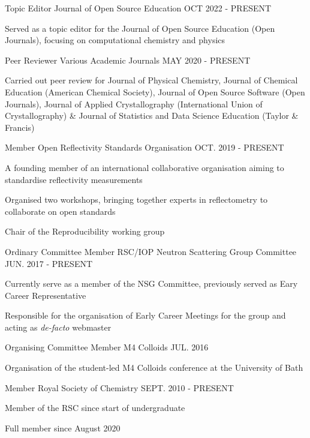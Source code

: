 \begin{cventries}
  \cventry
    {Topic Editor}
    {Journal of Open Source Education}
    {}
    {OCT 2022 - PRESENT}
    {
    	\begin{cvitems}
	    \item{Served as a topic editor for the Journal of Open Source Education (Open Journals), focusing on computational chemistry and physics}
	\end{cvitems}
    }
  \cventry
    {Peer Reviewer}
    {Various Academic Journals}
    {}
    {MAY 2020 - PRESENT}
    {
        \begin{cvitems}
            \item{Carried out peer review for Journal of Physical Chemistry, Journal of Chemical Education (American Chemical Society), Journal of Open Source Software (Open Journals), Journal of Applied Crystallography (International Union of Crystallography) \& Journal of Statistics and Data Science Education (Taylor \& Francis)}
        \end{cvitems}
    }
  \cventry
    {Member}
    {Open Reflectivity Standards Organisation}
    {}
    {OCT. 2019 - PRESENT}
    {
      \begin {cvitems}
        \item {A founding member of an international collaborative organisation aiming to standardise reflectivity measurements}
        \item {Organised two workshops, bringing together experts in reflectometry to collaborate on open standards}
        \item {Chair of the Reproducibility working group}
      \end {cvitems}
    }
  \cventry
    {Ordinary Committee Member}
    {RSC/IOP Neutron Scattering Group Committee}
    {}
    {JUN. 2017 - PRESENT}
    {
      \begin{cvitems}
      	\item{Currently serve as a member of the NSG Committee, previously served as Eary Career Representative}
      	\item{Responsible for the organisation of Early Career Meetings for the group and acting as \emph{de-facto} webmaster}
	  \end{cvitems}
	}
  \cventry
    {Organising Committee Member}
    {M4 Colloids}
    {}
    {JUL. 2016}
    {
      \begin{cvitems}
        \item{Organisation of the student-led M4 Colloids conference at the University of Bath}
      \end{cvitems}
    }
  \cventry
    {Member}
    {Royal Society of Chemistry}
    {}
    {SEPT. 2010 - PRESENT}
    {
      \begin{cvitems}
      	\item{Member of the RSC since start of undergraduate}
      	\item{Full member since August 2020}
      \end{cvitems}
    }
\end{cventries}
